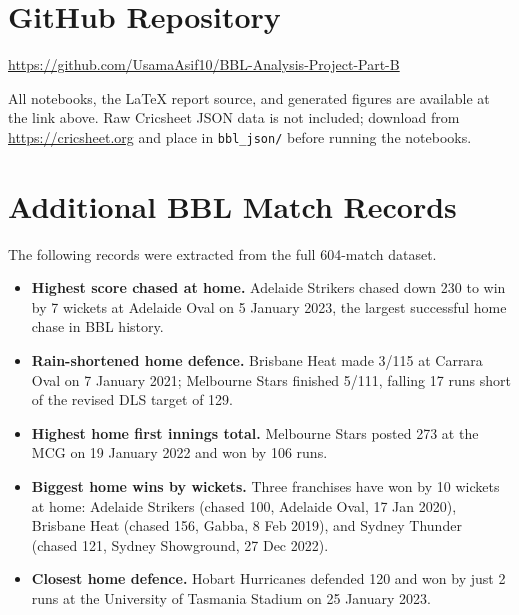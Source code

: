\documentclass[12pt,a4paper]{article}
\begin{document}
\section{GitHub Repository}

\url{https://github.com/UsamaAsif10/BBL-Analysis-Project-Part-B}

All notebooks, the LaTeX report source, and generated figures are available at the link
above. Raw Cricsheet JSON data is not included; download from \url{https://cricsheet.org}
and place in \texttt{bbl\_json/} before running the notebooks.

\section{Additional BBL Match Records}

The following records were extracted from the full 604-match dataset.

\begin{itemize}

  \item \textbf{Highest score chased at home.} Adelaide Strikers chased down 230 to win by
    7 wickets at Adelaide Oval on 5 January 2023, the largest successful home chase in
    BBL history.

  \item \textbf{Rain-shortened home defence.} Brisbane Heat made 3/115 at Carrara Oval on
    7 January 2021; Melbourne Stars finished 5/111, falling 17 runs short of the revised
    DLS target of 129.

  \item \textbf{Highest home first innings total.} Melbourne Stars posted 273 at the MCG on
    19 January 2022 and won by 106 runs.

  \item \textbf{Biggest home wins by wickets.} Three franchises have won by 10 wickets at
    home: Adelaide Strikers (chased 100, Adelaide Oval, 17 Jan 2020), Brisbane Heat (chased
    156, Gabba, 8 Feb 2019), and Sydney Thunder (chased 121, Sydney Showground, 27 Dec
    2022).

  \item \textbf{Closest home defence.} Hobart Hurricanes defended 120 and won by just
    2 runs at the University of Tasmania Stadium on 25 January 2023.

\end{itemize}
\end{document}

